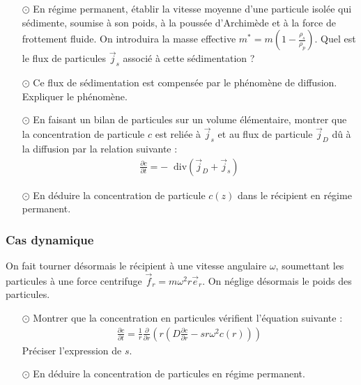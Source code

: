 \documentclass{report}
\newcommand*\diver{\mathop{}\!\mathrm{div}}
\begin{document}
\begin{itemize}
	
	\item[$\odot$] En régime permanent, établir la vitesse moyenne d'une particule isolée qui sédimente, soumise à son poids, à la poussée d'Archimède et à la force de frottement fluide.	On introduira la masse effective $m^*=m\left( 1-\frac{\rho_s}{\rho_p}\right) $. Quel est le flux de particules $\vec{j}_s$ associé à cette sédimentation ? 
	
	\item[$\odot$] Ce flux de sédimentation est compensée par le phénomène de diffusion. Expliquer le phénomène. 
	
	\item[$\odot$] En faisant un bilan de particules sur un volume élémentaire, montrer que la concentration de particule $c$ est reliée à $\vec{j}_s$ et au flux de particule $\vec{j}_D$ dû à la diffusion par la relation suivante :
	\begin{align*}
		\frac{\partial c}{\partial t}=-\diver(\vec{j}_D+\vec{j}_s)
	\end{align*}
	
	\item[$\odot$] En déduire la concentration de particule $c(z)$ dans le récipient en régime permanent.
	
\end{itemize}

\subsubsection*{Cas dynamique}

On fait tourner désormais le récipient à une vitesse angulaire $\omega$, soumettant les particules à une force centrifuge $\vec{f}_r=m\omega^2r\vec{e}_r$. On néglige désormais le poids des particules.

\begin{itemize}

	\item[$\odot$] Montrer que la concentration en particules vérifient l'équation suivante :
	\begin{align*}
		\frac{\partial c}{\partial t}=\frac{1}{r}\frac{\partial }{\partial r}\left(r\left(D\frac{\partial c}{\partial r} -sr\omega^2c(r) \right) \right)
	\end{align*}
	Préciser l'expression de $s$.
	
	\item[$\odot$] En déduire la concentration de particules en régime permanent. 

\end{itemize}
\end{document}
